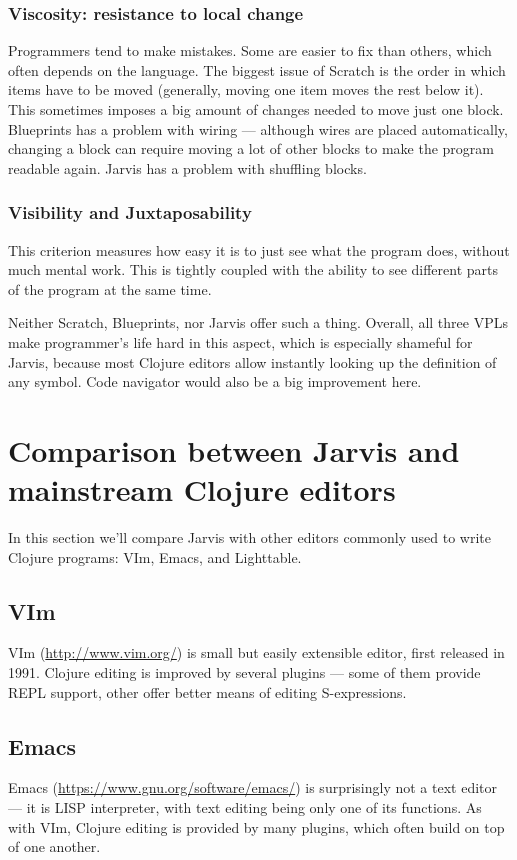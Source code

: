 \documentclass[11pt]{scrartcl}
\begin{document}
\subsubsection{Viscosity: resistance to local change}
Programmers tend to make mistakes.
Some are easier to fix than others, which often depends on the language.
The biggest issue of Scratch is the order in which items have to be moved
(generally, moving one item moves the rest below it).
This sometimes imposes a big amount of changes needed to move just one block.
Blueprints has a problem with wiring --- although wires are placed automatically,
changing a block can require moving a lot of other blocks to make the program
readable again.
Jarvis has a problem with shuffling blocks.

\subsubsection{Visibility and Juxtaposability}
This criterion measures how easy it is to just see what the program does,
without much mental work.
This is tightly coupled with the ability to see different parts of the program
at the same time.

Neither Scratch, Blueprints, nor Jarvis offer such a thing.
Overall, all three VPLs make programmer’s life hard in this aspect, which is
especially shameful for Jarvis, because most Clojure editors allow instantly
looking up the definition of any symbol.
Code navigator would also be a big improvement here.

\section{Comparison between Jarvis and mainstream Clojure editors}
In this section we'll compare Jarvis with other editors commonly used to write
Clojure programs: VIm, Emacs, and Lighttable.
\subsection{VIm}
VIm (\url{http://www.vim.org/}) is small but easily extensible editor, first
released in 1991. Clojure editing is improved by several plugins --- some of
them provide REPL support, other offer better means of editing S-expressions.
\subsection{Emacs}
Emacs (\url{https://www.gnu.org/software/emacs/}) is surprisingly not a text
editor --- it is LISP interpreter, with text editing being only one of its
functions. As with VIm, Clojure editing is provided by many plugins, which often
build on top of one another.
\end{document}
